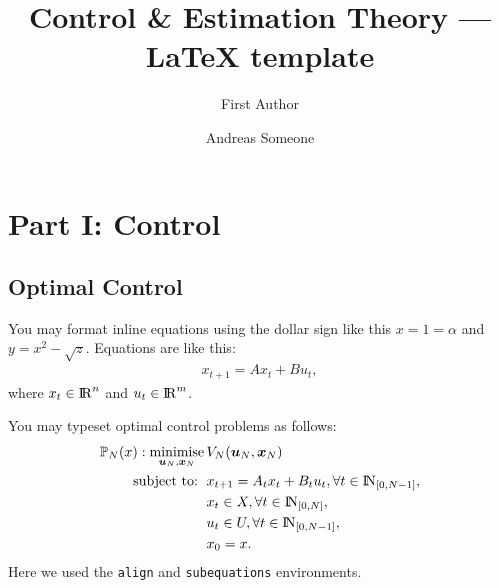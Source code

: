 \documentclass[a4paper,11pt,reqno]{amsart}
\title[ELE8088 Coursework]{Control \& Estimation Theory --- LaTeX template}
\author[F. Author]{First Author}
\author[A. Someone]{Andreas Someone}
\newcommand{\R}{{\rm I\!R}}
\newcommand{\N}{{\rm I\!N}}
\DeclareMathOperator*{\minimise}{minimise}
\begin{document}
\maketitle



\section{Part I: Control}


\subsection{Optimal Control}\label{sec:q1}
You may format inline equations using the dollar sign
like this $x = 1 = \alpha$ and $y = x^2 - \sqrt{z}$.
Equations are like this:
\begin{align}
    \label{eq:lti_state_update}
    x_{t+1} = A x_t + Bu_t,
\end{align}
where $x_t\in\R^n$ and $u_t\in\R^m$.

You may typeset optimal control problems as follows:
\begin{subequations}
    \begin{align}
        \mathbb{P}_N(x): \minimise_{\bm{u}_N,\bm{x}_N} \,
         & V_N(\bm{u}_{N}, \bm{x}_N)
        \\
        \text{subject to: }\,
         & x_{t+1} = A_t x_t + B_t u_t, \forall t\in\N_{[0, N-1]},
        \\
         & x_{t} \in X, \forall t \in \N_{[0, N]},
        \\
         & u_{t} \in U, \forall t \in \N_{[0, N-1]},
        \\
         & x_{0} = x.
    \end{align}
\end{subequations}
Here we used the \texttt{align} and \texttt{subequations} environments.


\end{document}
